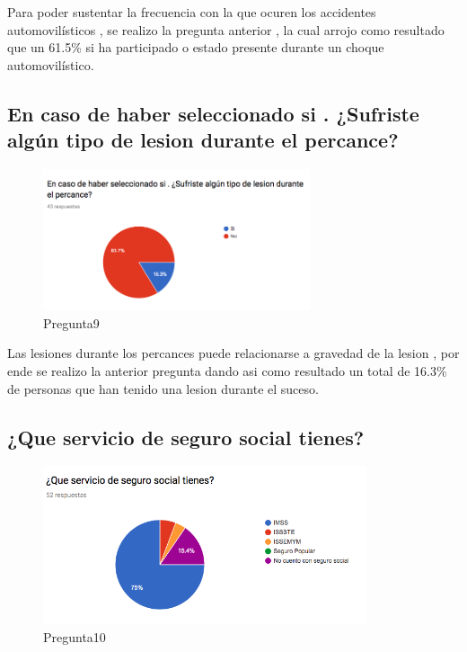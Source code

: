Para poder sustentar la frecuencia con la que ocuren los accidentes automovilísticos , se realizo la pregunta anterior , la cual arrojo como resultado que un 61.5\% si ha participado o estado presente durante un choque automovilístico. \\

\subsection{En caso de haber seleccionado si . ¿Sufriste algún tipo de lesion durante el percance?}

\begin{figure}[htbp!]
	\begin{center}
		\includegraphics[width=0.7\textwidth]{DisenoEstructura/imagenes/Pregunta9}
		\caption{Pregunta9}
		\label{DE/FO/Pregunta9}
	\end{center}
\end{figure}

Las lesiones durante los percances puede relacionarse a gravedad de la lesion , por ende se realizo la anterior pregunta dando asi como resultado un total de 16.3\%  de personas que han tenido una lesion durante el suceso.\\

\subsection{¿Que servicio de seguro social tienes?}

\begin{figure}[htbp!]
	\begin{center}
		\includegraphics[width=0.85\textwidth]{DisenoEstructura/imagenes/Pregunta10}
		\caption{Pregunta10}
		\label{DE/FO/Pregunta10}
	\end{center}
\end{figure}

